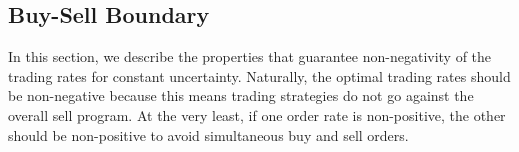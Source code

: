 \documentclass[12pt, letterpaper]{article}
\newcommand{\tim}[1]{  \textcolor{blue}{#1}}
\numberwithin{equation}{section}
\numberwithin{theorem}{section}
\begin{document}
%
%
% 

\subsection{Buy-Sell Boundary}\label{sec:buySellRegions}
In this section, we describe the properties that guarantee non-negativity of the trading rates for constant uncertainty. Naturally, the optimal trading rates should  be non-negative  because this means trading strategies do not go against the overall sell program. At the very least, if one order rate is non-positive, the other should be non-positive to avoid simultaneous buy and sell orders. 
\end{document}
